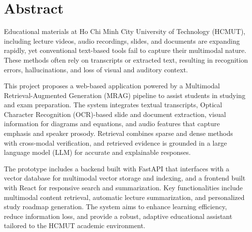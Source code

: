 \chapter*{Abstract}

Educational materials at Ho Chi Minh City University of Technology (HCMUT), including lecture videos, audio recordings, slides, and documents are expanding rapidly, yet conventional text-based tools fail to capture their multimodal nature. These methods often rely on transcripts or extracted text, resulting in recognition errors, hallucinations, and loss of visual and auditory context.

This project proposes a web-based application powered by a Multimodal Retrieval-Augmented Generation (MRAG) pipeline to assist students in studying and exam preparation. The system integrates textual transcripts, Optical Character Recognition (OCR)-based slide and document extraction, visual information for diagrams and equations, and audio features that capture emphasis and speaker prosody. Retrieval combines sparse and dense methods with cross-modal verification, and retrieved evidence is grounded in a large language model (LLM) for accurate and explainable responses.

The prototype includes a backend built with FastAPI that interfaces with a vector database for multimodal vector storage and indexing, and a frontend built with React for responsive search and summarization. Key functionalities include multimodal content retrieval, automatic lecture summarization, and personalized study roadmap generation. The system aims to enhance learning efficiency, reduce information loss, and provide a robust, adaptive educational assistant tailored to the HCMUT academic environment.

\newpage
